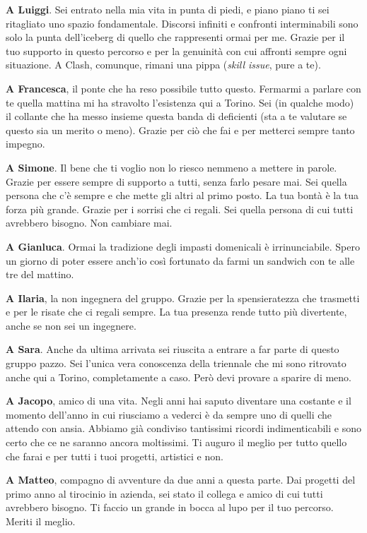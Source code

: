 {\textbf{A Luiggi}. Sei entrato nella mia vita in punta di piedi, e piano piano ti sei ritagliato uno spazio fondamentale. Discorsi infiniti e confronti interminabili sono solo la punta dell'iceberg di quello che rappresenti ormai per me. Grazie per il tuo supporto in questo percorso e per la genuinità con cui affronti sempre ogni situazione. A Clash, comunque, rimani una pippa (\emph{skill issue}, pure a te).

\textbf{A Francesca}, il ponte che ha reso possibile tutto questo. Fermarmi a parlare con te quella mattina mi ha stravolto l'esistenza qui a Torino. Sei (in qualche modo) il collante che ha messo insieme questa banda di deficienti (sta a te valutare se questo sia un merito o meno). Grazie per ciò che fai e per metterci sempre tanto impegno.

\textbf{A Simone}. Il bene che ti voglio non lo riesco nemmeno a mettere in parole. Grazie per essere sempre di supporto a tutti, senza farlo pesare mai. Sei quella persona che c'è sempre e che mette gli altri al primo posto. La tua bontà è la tua forza più grande. Grazie per i sorrisi che ci regali. Sei quella persona di cui tutti avrebbero bisogno. Non cambiare mai.

\textbf{A Gianluca}. Ormai la tradizione degli impasti domenicali è irrinunciabile. Spero un giorno di poter essere anch'io così fortunato da farmi un sandwich con te alle tre del mattino.

\textbf{A Ilaria}, la non ingegnera del gruppo. Grazie per la spensieratezza che trasmetti e per le risate che ci regali sempre. La tua presenza rende tutto più divertente, anche se non sei un ingegnere.

\textbf{A Sara}. Anche da ultima arrivata sei riuscita a entrare a far parte di questo gruppo pazzo. Sei l'unica vera conoscenza della triennale che mi sono ritrovato anche qui a Torino, completamente a caso. Però devi provare a sparire di meno.

\textbf{A Jacopo}, amico di una vita. Negli anni hai saputo diventare una costante e il momento dell'anno in cui riusciamo a vederci è da sempre uno di quelli che attendo con ansia. Abbiamo già condiviso tantissimi ricordi indimenticabili e sono certo che ce ne saranno ancora moltissimi. Ti auguro il meglio per tutto quello che farai e per tutti i tuoi progetti, artistici e non.

\textbf{A Matteo}, compagno di avventure da due anni a questa parte. Dai progetti del primo anno al tirocinio in azienda, sei stato il collega e amico di cui tutti avrebbero bisogno. Ti faccio un grande in bocca al lupo per il tuo percorso. Meriti il meglio.

}
